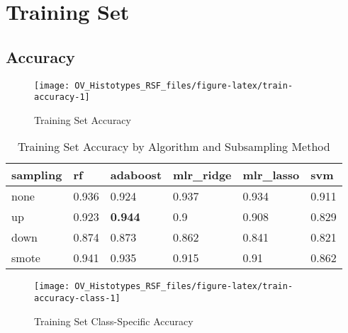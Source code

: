 \documentclass[
]{report}
\begin{document}
\hypertarget{training-set}{%
\section{Training Set}\label{training-set}}

\hypertarget{accuracy}{%
\subsection{Accuracy}\label{accuracy}}

\begin{figure}[H]

{\centering \texttt{[image: OV\_Histotypes\_RSF\_files/figure-latex/train-accuracy-1]} 

}

\caption{Training Set Accuracy}\label{fig:train-accuracy}
\end{figure}

\begin{table}

\caption{\label{tab:train-accuracy-table}Training Set Accuracy by Algorithm and Subsampling Method}
\centering
\begin{tabular}[t]{l|l|l|l|l|l}
\hline
sampling & rf & adaboost & mlr\_ridge & mlr\_lasso & svm\\
\hline
none & 0.936 & 0.924 & 0.937 & 0.934 & 0.911\\
\hline
up & 0.923 & \textbf{0.944} & 0.9 & 0.908 & 0.829\\
\hline
down & 0.874 & 0.873 & 0.862 & 0.841 & 0.821\\
\hline
smote & 0.941 & 0.935 & 0.915 & 0.91 & 0.862\\
\hline
\end{tabular}
\end{table}

\begin{figure}[H]

{\centering \texttt{[image: OV\_Histotypes\_RSF\_files/figure-latex/train-accuracy-class-1]} 

}

\caption{Training Set Class-Specific Accuracy}\label{fig:train-accuracy-class}
\end{figure}
\end{document}
